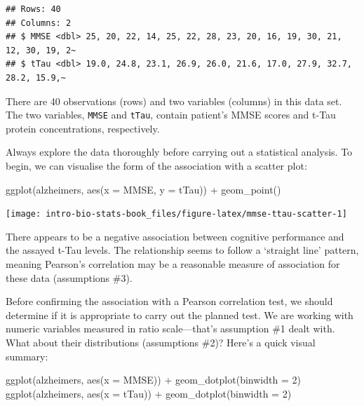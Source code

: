 \documentclass[
]{book}
\newenvironment{Shaded}{\begin{snugshade}}{\end{snugshade}}
\newcommand{\AttributeTok}[1]{\textcolor[rgb]{0.77,0.63,0.00}{#1}}
\newcommand{\DecValTok}[1]{\textcolor[rgb]{0.00,0.00,0.81}{#1}}
\newcommand{\FunctionTok}[1]{\textcolor[rgb]{0.00,0.00,0.00}{#1}}
\newcommand{\NormalTok}[1]{#1}
\newcommand{\SpecialCharTok}[1]{\textcolor[rgb]{0.00,0.00,0.00}{#1}}
\begin{document}
\begin{verbatim}
## Rows: 40
## Columns: 2
## $ MMSE <dbl> 25, 20, 22, 14, 25, 22, 28, 23, 20, 16, 19, 30, 21, 12, 30, 19, 2~
## $ tTau <dbl> 19.0, 24.8, 23.1, 26.9, 26.0, 21.6, 17.0, 27.9, 32.7, 28.2, 15.9,~
\end{verbatim}

There are 40 observations (rows) and two variables (columns) in this data set. The two variables, \texttt{MMSE} and \texttt{tTau}, contain patient's MMSE scores and t-Tau protein concentrations, respectively.

Always explore the data thoroughly before carrying out a statistical analysis. To begin, we can visualise the form of the association with a scatter plot:

\begin{Shaded}
\begin{Highlighting}[]
\FunctionTok{ggplot}\NormalTok{(alzheimers, }\FunctionTok{aes}\NormalTok{(}\AttributeTok{x =}\NormalTok{ MMSE, }\AttributeTok{y =}\NormalTok{ tTau)) }\SpecialCharTok{+}
  \FunctionTok{geom\_point}\NormalTok{()}
\end{Highlighting}
\end{Shaded}

\begin{center}\texttt{[image: intro-bio-stats-book\_files/figure-latex/mmse-ttau-scatter-1]} \end{center}

There appears to be a negative association between cognitive performance and the assayed t-Tau levels. The relationship seems to follow a `straight line' pattern, meaning Pearson's correlation may be a reasonable measure of association for these data (assumptions \#3).

Before confirming the association with a Pearson correlation test, we should determine if it is appropriate to carry out the planned test. We are working with numeric variables measured in ratio scale---that's assumption \#1 dealt with. What about their distributions (assumptions \#2)? Here's a quick visual summary:

\begin{Shaded}
\begin{Highlighting}[]
\FunctionTok{ggplot}\NormalTok{(alzheimers, }\FunctionTok{aes}\NormalTok{(}\AttributeTok{x =}\NormalTok{ MMSE)) }\SpecialCharTok{+} 
  \FunctionTok{geom\_dotplot}\NormalTok{(}\AttributeTok{binwidth =} \DecValTok{2}\NormalTok{)}
\FunctionTok{ggplot}\NormalTok{(alzheimers, }\FunctionTok{aes}\NormalTok{(}\AttributeTok{x =}\NormalTok{ tTau)) }\SpecialCharTok{+} 
  \FunctionTok{geom\_dotplot}\NormalTok{(}\AttributeTok{binwidth =} \DecValTok{2}\NormalTok{)}
\end{Highlighting}
\end{Shaded}
\end{document}
